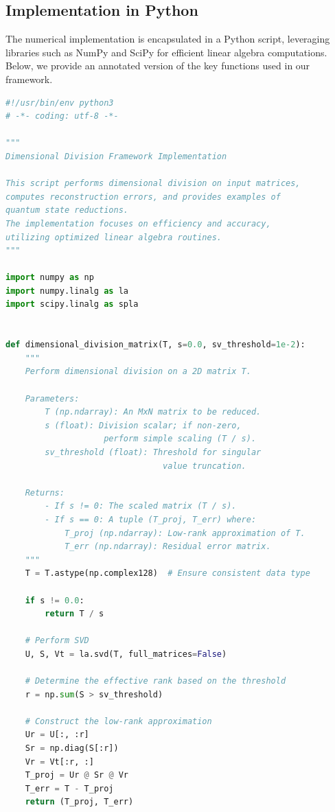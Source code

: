 \documentclass[sn-mathphys-num]{sn-jnl}
\theoremstyle{thmstyleone}
\theoremstyle{thmstyletwo}
\theoremstyle{thmstylethree}
\begin{document}
\begin{appendices}
\subsection{Implementation in Python}

The numerical implementation is encapsulated in a Python script, leveraging libraries such as NumPy and SciPy for efficient linear algebra computations. Below, we provide an annotated version of the key functions used in our framework.

\begin{lstlisting}[language=Python,caption={Annotated Python implementation of the dimensional division framework.},label={lst:dim-division-implementation}]
#!/usr/bin/env python3
# -*- coding: utf-8 -*-

"""
Dimensional Division Framework Implementation

This script performs dimensional division on input matrices, 
computes reconstruction errors, and provides examples of 
quantum state reductions. 
The implementation focuses on efficiency and accuracy, 
utilizing optimized linear algebra routines.
"""

import numpy as np
import numpy.linalg as la
import scipy.linalg as spla


def dimensional_division_matrix(T, s=0.0, sv_threshold=1e-2):
    """
    Perform dimensional division on a 2D matrix T.
    
    Parameters:
        T (np.ndarray): An MxN matrix to be reduced.
        s (float): Division scalar; if non-zero, 
                    perform simple scaling (T / s).
        sv_threshold (float): Threshold for singular 
                                value truncation.
        
    Returns:
        - If s != 0: The scaled matrix (T / s).
        - If s == 0: A tuple (T_proj, T_err) where:
            T_proj (np.ndarray): Low-rank approximation of T.
            T_err (np.ndarray): Residual error matrix.
    """
    T = T.astype(np.complex128)  # Ensure consistent data type
    
    if s != 0.0:
        return T / s
    
    # Perform SVD
    U, S, Vt = la.svd(T, full_matrices=False)
    
    # Determine the effective rank based on the threshold
    r = np.sum(S > sv_threshold)
    
    # Construct the low-rank approximation
    Ur = U[:, :r]
    Sr = np.diag(S[:r])
    Vr = Vt[:r, :]
    T_proj = Ur @ Sr @ Vr
    T_err = T - T_proj
    return (T_proj, T_err)



\end{lstlisting}
\end{appendices}
\end{document}

